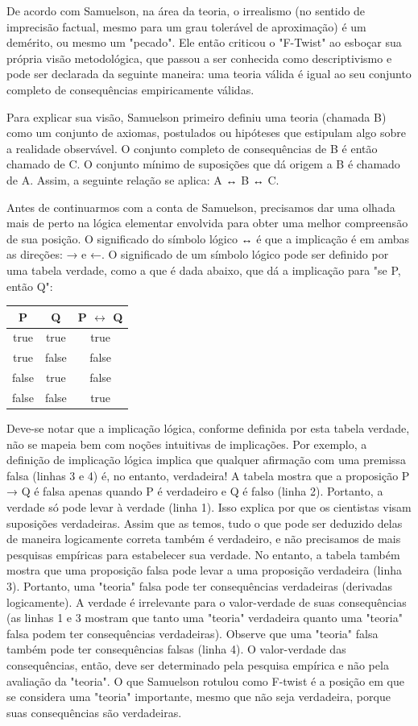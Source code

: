\documentclass[12pt]{article}
\begin{document}
De acordo com Samuelson, na área da teoria, o irrealismo (no sentido de imprecisão factual, mesmo para um grau tolerável de aproximação) é um demérito, ou mesmo um "pecado". Ele então criticou o "F-Twist" ao esboçar sua própria visão metodológica, que passou a ser conhecida como descriptivismo e pode ser declarada da seguinte maneira: uma teoria válida é igual ao seu conjunto completo de consequências empiricamente válidas.

Para explicar sua visão, Samuelson primeiro definiu uma teoria (chamada B) como um conjunto de axiomas, postulados ou hipóteses que estipulam algo sobre a realidade observável. O conjunto completo de consequências de B é então chamado de C. O conjunto mínimo de suposições que dá origem a B é chamado de A. Assim, a seguinte relação se aplica: A ↔ B ↔ C.

Antes de continuarmos com a conta de Samuelson, precisamos dar uma olhada mais de perto na lógica elementar envolvida para obter uma melhor compreensão de sua posição. O significado do símbolo lógico ↔ é que a implicação é em ambas as direções: → e ←. O significado de um símbolo lógico pode ser definido por uma tabela verdade, como a que é dada abaixo, que dá a implicação para "se P, então Q":

\begin{center}
\begin{tabular}{|c|c|c|}
\hline
P & Q & P $\leftrightarrow$ Q \\
\hline
true & true & true \\
true & false & false \\
false & true & false \\
false & false & true \\
\hline
\end{tabular}
\end{center}

Deve-se notar que a implicação lógica, conforme definida por esta tabela verdade, não se mapeia bem com noções intuitivas de implicações. Por exemplo, a definição de implicação lógica implica que qualquer afirmação com uma premissa falsa (linhas 3 e 4) é, no entanto, verdadeira! A tabela mostra que a proposição P → Q é falsa apenas quando P é verdadeiro e Q é falso (linha 2). Portanto, a verdade só pode levar à verdade (linha 1). Isso explica por que os cientistas visam suposições verdadeiras. Assim que as temos, tudo o que pode ser deduzido delas de maneira logicamente correta também é verdadeiro, e não precisamos de mais pesquisas empíricas para estabelecer sua verdade. No entanto, a tabela também mostra que uma proposição falsa pode levar a uma proposição verdadeira (linha 3). Portanto, uma "teoria" falsa pode ter consequências verdadeiras (derivadas logicamente). A verdade é irrelevante para o valor-verdade de suas consequências (as linhas 1 e 3 mostram que tanto uma "teoria" verdadeira quanto uma "teoria" falsa podem ter consequências verdadeiras). Observe que uma "teoria" falsa também pode ter consequências falsas (linha 4). O valor-verdade das consequências, então, deve ser determinado pela pesquisa empírica e não pela avaliação da "teoria". O que Samuelson rotulou como F-twist é a posição em que se considera uma "teoria" importante, mesmo que não seja verdadeira, porque suas consequências são verdadeiras.
\end{document}
